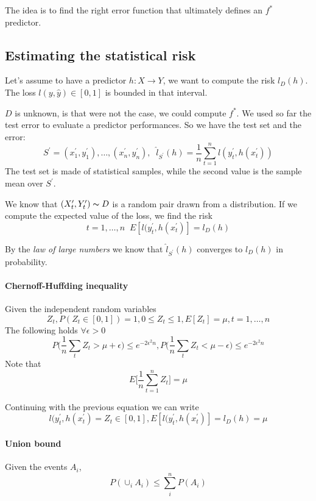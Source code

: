 \begin{remark}
    The idea is to find the right error function that ultimately 
    defines an $f^*$ predictor.
\end{remark}

\subsection{Estimating the statistical risk}
\label{stat}
Let's assume to have a predictor $h : X \rightarrow Y$, we want to compute the risk $l_D(h)$. 
The loss $l(y, \hat{y}) \in [0,1]$ is bounded in that interval.

$D$ is unknown, is that were not the case, we could compute $f^*$.
We used so far the test error to evaluate a predictor performances.
So we have the test set and the error:
$$S^\prime = (x^\prime_1, y^\prime_1), \dots, (x^\prime_n, y^\prime_n),\;\;
\hat{l}_{S^\prime}(h) = \frac{1}{n}\sum_{t = 1}^n l(y^\prime_t, h(x_t^\prime))$$
The test set is made of statistical samples, 
while the second value is the sample mean over $S^\prime$.

We know that $(X_t^\prime, Y_t^\prime) \thicksim D$ is a random pair drawn from a distribution.
If we compute the expected value of the loss, we find the risk
$$t = 1, \dots, n \;\; E[l(y^\prime_t, h(x_t^\prime)] = l_D(h)$$

By the \emph{law of large numbers} we know that $\hat{l}_{S^\prime}(h)$ converges to 
$l_D(h)$ in probability.

\paragraph{Chernoff-Huffding inequality}
Given the independent random variables $$Z_t,
P(Z_t \in [0,1]) = 1, 0 \leq Z_t \leq 1, E[Z_t] = \mu, t=1, \dots, n$$
The following holds $\forall \epsilon > 0$
$$P\bigg(\frac{1}{n}\sum_t Z_t > \mu + \epsilon\bigg) \leq e^{-2\epsilon ^2 n}, 
P\bigg(\frac{1}{n}\sum_t Z_t < \mu - \epsilon\bigg) \leq e^{-2\epsilon ^2 n}$$
Note that 
$$E\bigg[\frac{1}{n}\sum_{t=1}^{n}Z_t\bigg] = \mu$$

Continuing with the previous equation we can write
$$l(y^\prime_t, h(x_t^\prime) = Z_t \in [0,1], E[l(y^\prime_t, h(x_t^\prime)] = l_D(h) = \mu$$

\paragraph{Union bound}
Given the events $A_i$, $$P(\cup_i A_i) \leq \sum_i^n P(A_i)$$

